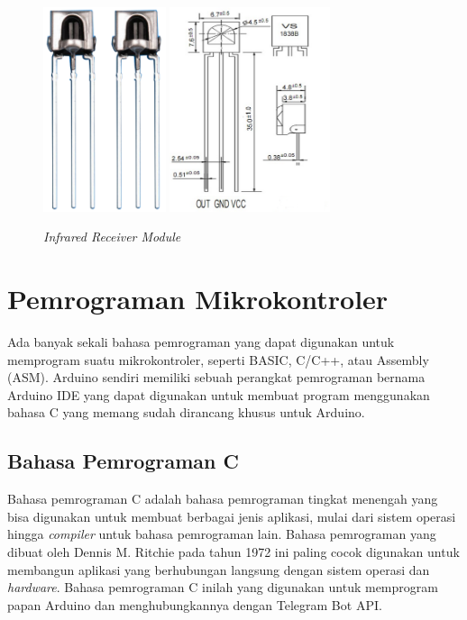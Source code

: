 \begin{figure}[H]
	\centerline {
		\includegraphics[height=6cm]{bab3/img/ir-receiver2.png}
		\includegraphics[height=6cm]{bab3/img/ir-receiver4.png}
	}
	\caption{\textit{Infrared Receiver Module}}
	\label{figure:ir-receiver4}
\end{figure}

\section{Pemrograman Mikrokontroler}
\tab Ada banyak sekali bahasa pemrograman yang dapat digunakan untuk memprogram suatu mikrokontroler, seperti BASIC, C/C++, atau Assembly (ASM). Arduino sendiri memiliki sebuah perangkat pemrograman bernama Arduino IDE yang dapat digunakan untuk membuat program menggunakan bahasa C yang memang sudah dirancang khusus untuk Arduino. 

\subsection{Bahasa Pemrograman C}
\tab Bahasa pemrograman C adalah bahasa pemrograman tingkat menengah yang bisa digunakan untuk membuat berbagai jenis aplikasi, mulai dari sistem operasi hingga \textit{compiler} untuk bahasa pemrograman lain. Bahasa pemrograman yang dibuat oleh Dennis M. Ritchie pada tahun 1972 ini paling cocok digunakan untuk membangun aplikasi yang berhubungan langsung dengan sistem operasi dan \textit{hardware}. Bahasa pemrograman C inilah yang digunakan untuk memprogram papan Arduino dan menghubungkannya dengan Telegram Bot API.\\


